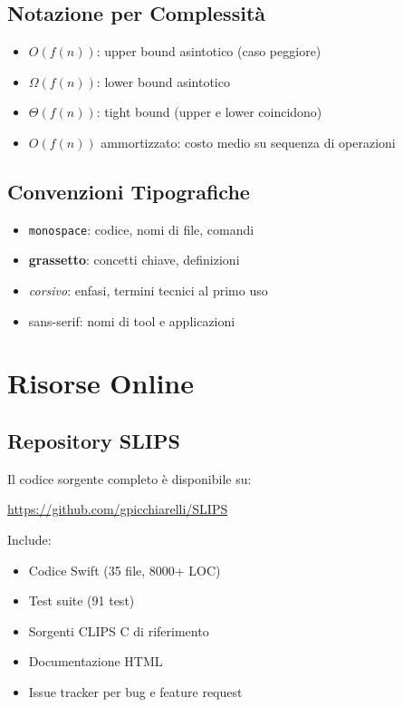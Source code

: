 \subsection{Notazione per Complessità}

\begin{itemize}
\item $O(f(n))$: upper bound asintotico (caso peggiore)
\item $\Omega(f(n))$: lower bound asintotico
\item $\Theta(f(n))$: tight bound (upper e lower coincidono)
\item $O(f(n))$ ammortizzato: costo medio su sequenza di operazioni
\end{itemize}

\subsection{Convenzioni Tipografiche}

\begin{itemize}
\item \texttt{monospace}: codice, nomi di file, comandi
\item \textbf{grassetto}: concetti chiave, definizioni
\item \textit{corsivo}: enfasi, termini tecnici al primo uso
\item \textsf{sans-serif}: nomi di tool e applicazioni
\end{itemize}

\section{Risorse Online}

\subsection{Repository SLIPS}

Il codice sorgente completo è disponibile su:

\begin{center}
\url{https://github.com/gpicchiarelli/SLIPS}
\end{center}

Include:
\begin{itemize}
\item Codice Swift (35 file, 8000+ LOC)
\item Test suite (91 test)
\item Sorgenti CLIPS C di riferimento
\item Documentazione HTML
\item Issue tracker per bug e feature request
\end{itemize}

